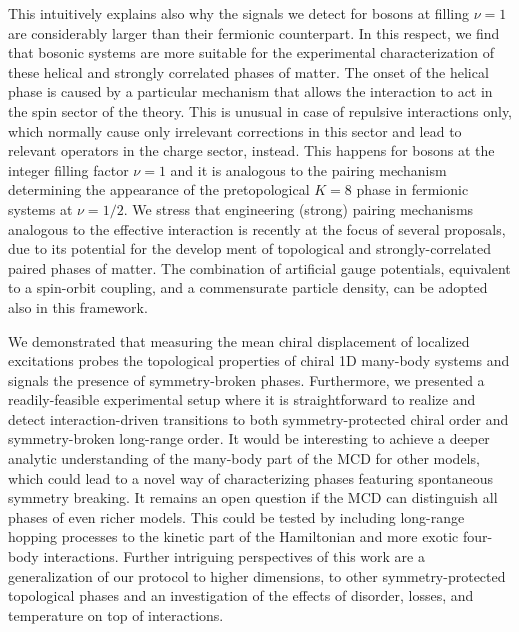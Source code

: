 This intuitively explains also why the signals we detect for bosons at filling $\nu = 1$ are considerably larger than their fermionic counterpart.
In this respect, we find that bosonic systems are more suitable for the experimental characterization of these helical and strongly correlated phases of matter.
The onset of the helical phase is caused by a particular mechanism that allows the interaction to act in the spin sector of the theory.
This is unusual in case of repulsive interactions only, which normally cause only irrelevant corrections in this sector and lead to relevant operators in the charge sector, instead.
This happens for bosons at the integer filling factor $\nu=1$ and it is analogous to the pairing mechanism determining the appearance of the pretopological $K = 8$ phase in fermionic systems at $\nu=1/2$.
We stress that engineering (strong) pairing mechanisms analogous to the effective interaction is recently at the focus of several proposals, due to its potential for the develop ment of topological and strongly-correlated paired phases of matter.
The combination of artificial gauge potentials, equivalent to a spin-orbit coupling, and a commensurate particle density, can be adopted also in this framework.

We demonstrated that measuring the mean chiral displacement of localized excitations probes the topological properties of chiral 1D many-body systems and signals the presence of symmetry-broken phases.
Furthermore, we presented a readily-feasible experimental setup where it is straightforward to realize and detect interaction-driven transitions to both symmetry-protected chiral order and symmetry-broken long-range order.
It would be interesting to achieve a deeper analytic understanding of the many-body part of the MCD for other models, which could lead to a novel way of characterizing phases featuring spontaneous symmetry breaking.
It remains an open question if the MCD can distinguish all phases of even richer models.
This could be tested by including long-range hopping processes to the kinetic part of the Hamiltonian and more exotic four-body interactions.
Further intriguing perspectives of this work are a generalization of our protocol to higher dimensions, to other symmetry-protected topological phases and an investigation of the effects of disorder, losses, and temperature on top of interactions.
